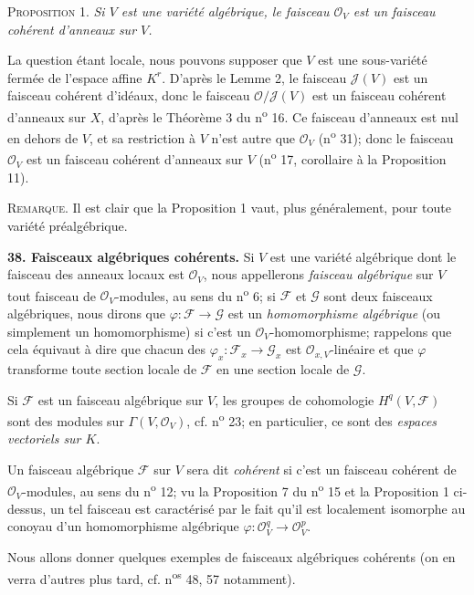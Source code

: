 \textsc{Proposition} 1. \textit{Si $V$ est une variété algébrique, le faisceau $\mathcal{O}_V$ est un faisceau cohérent d'anneaux sur $V$.}

La question étant locale, nous pouvons supposer que $V$ est une sous-variété fermée de l'espace affine $K^r$. D'après le Lemme 2, le faisceau $\mathcal{J}(V)$ est un faisceau cohérent d'idéaux, donc le faisceau $\mathcal{O}/\mathcal{J}(V)$ est un faisceau cohérent d'anneaux sur $X$, d'après le Théorème 3 du n\textsuperscript{o} 16. Ce faisceau d'anneaux est nul en dehors de $V$, et sa restriction à $V$ n'est autre que $\mathcal{O}_V$ (n\textsuperscript{o} 31); donc le faisceau $\mathcal{O}_V$ est un faisceau cohérent d'anneaux sur $V$ (n\textsuperscript{o} 17, corollaire à la Proposition 11).

\textsc{Remarque}. Il est clair que la Proposition 1 vaut, plus généralement, pour toute variété préalgébrique.

\textbf{38. Faisceaux algébriques cohérents.} Si $V$ est une variété algébrique dont le faisceau des anneaux locaux est $\mathcal{O}_V$, nous appellerons \textit{faisceau algébrique} sur $V$ tout faisceau de $\mathcal{O}_V$-modules, au sens du n\textsuperscript{o} 6; si $\mathcal{F}$ et $\mathcal{G}$ sont deux faisceaux algébriques, nous dirons que $\varphi : \mathcal{F} \to \mathcal{G}$ est un \textit{homomorphisme algébrique} (ou simplement un homomorphisme) si c'est un $\mathcal{O}_V$-homomorphisme; rappelons que cela équivaut à dire que chacun des $\varphi_x : \mathcal{F}_x \to \mathcal{G}_x$ est $\mathcal{O}_{x,V}$-linéaire et que $\varphi$ transforme toute section locale de $\mathcal{F}$ en une section locale de $\mathcal{G}$.

Si $\mathcal{F}$ est un faisceau algébrique sur $V$, les groupes de cohomologie $H^q(V, \mathcal{F})$ sont des modules sur $\Gamma(V, \mathcal{O}_V)$, cf. n\textsuperscript{o} 23; en particulier, ce sont des \textit{espaces vectoriels sur $K$}.

Un faisceau algébrique $\mathcal{F}$ sur $V$ sera dit \textit{cohérent} si c'est un faisceau cohérent de $\mathcal{O}_V$-modules, au sens du n\textsuperscript{o} 12; vu la Proposition 7 du n\textsuperscript{o} 15 et la Proposition 1 ci-dessus, un tel faisceau est caractérisé par le fait qu'il est localement isomorphe au conoyau d'un homomorphisme algébrique $\varphi : \mathcal{O}_V^q \to \mathcal{O}_V^p$.

Nous allons donner quelques exemples de faisceaux algébriques cohérents (on en verra d'autres plus tard, cf. n\textsuperscript{os} 48, 57 notamment).

